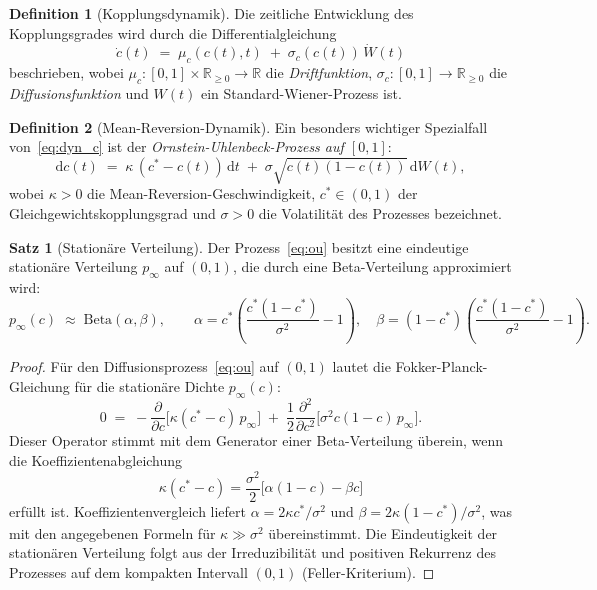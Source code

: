 ﻿\documentclass[a4paper,12pt]{article}
\theoremstyle{definition}
\newtheorem{definition}{Definition}
\newtheorem{satz}{Satz}
\begin{document}
\begin{definition}[Kopplungsdynamik]
\label{def:kopplungsDyn}
    Die zeitliche Entwicklung des Kopplungsgrades wird durch die
    Differentialgleichung
    \begin{equation}
    \label{eq:dyn_c}
        \dot{c}(t) \;=\; \mu_c(c(t), t) \;+\; \sigma_c(c(t))\,\dot{W}(t)
    \end{equation}
    beschrieben, wobei $\mu_c : [0,1] \times \mathbb{R}_{\geq 0} \to \mathbb{R}$
    die \emph{Driftfunktion}, $\sigma_c : [0,1] \to \mathbb{R}_{\geq 0}$
    die \emph{Diffusionsfunktion} und $W(t)$ ein Standard-Wiener-Prozess ist.
\end{definition}

\begin{definition}[Mean-Reversion-Dynamik]
\label{def:meanRev}
    Ein besonders wichtiger Spezialfall von~\eqref{eq:dyn_c} ist der
    \emph{Ornstein-Uhlenbeck-Prozess auf $[0,1]$}:
    \begin{equation}
    \label{eq:ou}
        \mathrm{d}c(t) \;=\; \kappa\,(c^* - c(t))\,\mathrm{d}t
        \;+\; \sigma\sqrt{c(t)(1-c(t))}\,\mathrm{d}W(t),
    \end{equation}
    wobei $\kappa > 0$ die Mean-Reversion-Geschwindigkeit,
    $c^* \in (0,1)$ der Gleichgewichtskopplungsgrad und
    $\sigma > 0$ die Volatilität des Prozesses bezeichnet.
\end{definition}

\begin{satz}[Stationäre Verteilung]
\label{satz:stationaer}
    Der Prozess~\eqref{eq:ou} besitzt eine eindeutige stationäre
    Verteilung $p_\infty$ auf $(0,1)$, die durch eine Beta-Verteilung
    approximiert wird:
    \[
        p_\infty(c) \;\approx\; \mathrm{Beta}(\alpha, \beta), \qquad
        \alpha = c^* \!\left(\frac{c^*(1-c^*)}{\sigma^2} - 1\right), \quad
        \beta = (1-c^*)\!\left(\frac{c^*(1-c^*)}{\sigma^2} - 1\right).
    \]
\end{satz}

\begin{proof}
    Für den Diffusionsprozess~\eqref{eq:ou} auf $(0,1)$ lautet die
    Fokker-Planck-Gleichung für die stationäre Dichte $p_\infty(c)$:
    \[
        0 \;=\; -\frac{\partial}{\partial c}\!\bigl[\kappa(c^*-c)\,p_\infty\bigr]
        \;+\; \frac{1}{2}\frac{\partial^2}{\partial c^2}
              \!\bigl[\sigma^2 c(1-c)\,p_\infty\bigr].
    \]
    Dieser Operator stimmt mit dem Generator einer Beta-Verteilung überein, wenn
    die Koeffizientenabgleichung
    \[
        \kappa(c^* - c) = \frac{\sigma^2}{2}\bigl[\alpha(1-c) - \beta c\bigr]
    \]
    erfüllt ist. Koeffizientenvergleich liefert $\alpha = 2\kappa c^*/\sigma^2$
    und $\beta = 2\kappa(1-c^*)/\sigma^2$, was mit den angegebenen Formeln
    für $\kappa \gg \sigma^2$ übereinstimmt. Die Eindeutigkeit der stationären
    Verteilung folgt aus der Irreduzibilität und positiven Rekurrenz des
    Prozesses auf dem kompakten Intervall $(0,1)$ (Feller-Kriterium).
\end{proof}
\end{document}
